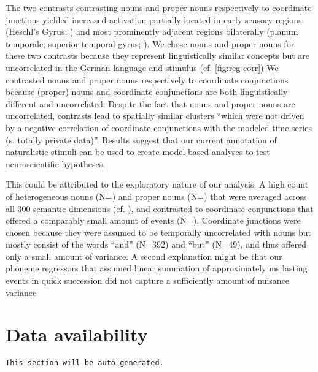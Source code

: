 \documentclass[10pt,a4paper,onecolumn]{article}
\begin{document}
The two contrasts contrasting nouns and proper nouns respectively to coordinate
junctions yielded increased activation partially located in early sensory
regions (Heschl's Gyrus; \citep{saenz2014tonotopic}) and most prominently
adjacent regions bilaterally (planum temporale; superior temporal gyrus;
\citep{arsenault2015distributed, mesgarani2014phonetic}).
We chose nouns and proper nouns for these two contrasts because they represent
linguistically similar concepts but are uncorrelated in the German language and
stimulus (cf. \ref{fig:reg-corr})
We contrasted nouns and proper nouns respectively to coordinate conjunctions
because (proper) nouns and coordinate conjunctions are both linguistically
different and uncorrelated.
 Despite the fact that nouns
and proper nouns are uncorrelated, contrasts lead to spatially similar clusters
``which were not driven by a negative correlation of coordinate conjunctions
with the modeled time series (s. totally private data)''.
Results suggest that our current annotation of naturalistic stimuli can be used
to create model-based analyses to test neuroscientific hypotheses.

This could be attributed to the exploratory nature of our analysis. A high count
of heterogeneous nouns (N=\rNnAll) and proper nouns (N=\rNeAll) that were
averaged across all 300 semantic dimensions (cf. \citep{mitchell2008predicting,
huth2016natural}), and contrasted to coordinate conjunctions that offered a
comparably small amount of events (N=\rKonAll).
Coordinate junctions were chosen because they were assumed to be temporally
uncorrelated with nouns but mostly consist of the words ``and'' (N=392) and
``but'' (N=49), and thus offered only a small amount of variance.
A second explanation might be that our phoneme regressors that assumed linear
summation of approximately \unit[70]{ms} lasting events in quick succession did
not capture a sufficiently amount of nuisance variance


\section*{Data availability}
\texttt{This section will be auto-generated.}
\end{document}
